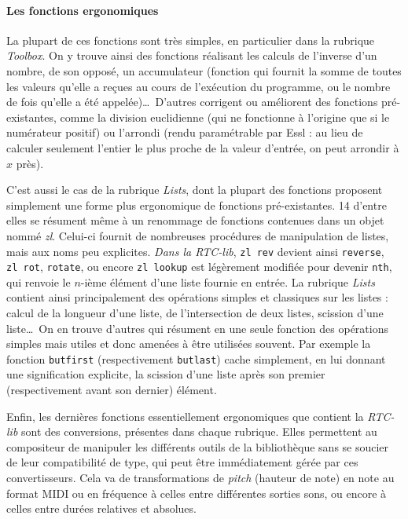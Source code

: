 \documentclass[a4paper,12pt]{article}
\begin{document}
\paragraph{Les fonctions ergonomiques \\}

La plupart de ces fonctions sont très simples, en particulier dans la rubrique \emph{Toolbox}. On y trouve ainsi des fonctions réalisant les calculs de l'inverse d'un nombre, de son opposé, un accumulateur (fonction qui fournit la somme de toutes les valeurs qu'elle a reçues au cours de l'exécution du programme, ou le nombre de fois qu'elle a été appelée)\dots~D'autres corrigent ou améliorent des fonctions pré-existantes, comme la division euclidienne (qui ne fonctionne à l'origine que si le numérateur positif) ou l'arrondi (rendu paramétrable par Essl : au lieu de calculer seulement l'entier le plus proche de la valeur d'entrée, on peut arrondir à $x$ près).

C'est aussi le cas de la rubrique \emph{Lists}, dont la plupart des fonctions proposent simplement une forme plus ergonomique de fonctions pré-existantes. 14 d'entre elles se résument même à un renommage de fonctions contenues dans un objet nommé \emph{zl}. Celui-ci fournit de nombreuses procédures de manipulation de listes, mais aux noms peu explicites. \emph{Dans la RTC-lib}, \texttt{zl~rev} devient ainsi \texttt{reverse}, \texttt{zl~rot}, \texttt{rotate}, ou encore \texttt{zl~lookup} est légèrement modifiée pour devenir \texttt{nth}, qui renvoie le $n$-ième élément d'une liste fournie en entrée. La rubrique \emph{Lists} contient ainsi principalement des opérations simples et classiques sur les listes : calcul de la longueur d'une liste, de l'intersection de deux listes, scission d'une liste\dots~On en trouve d'autres qui résument en une seule fonction des opérations simples mais utiles et donc amenées à être utilisées souvent. Par exemple la fonction \texttt{butfirst} (respectivement \texttt{butlast}) cache simplement, en lui donnant une signification explicite, la scission d'une liste après son premier (respectivement avant son dernier) élément.

Enfin, les dernières fonctions essentiellement ergonomiques que contient la \emph{RTC-lib} sont des conversions, présentes dans chaque rubrique. Elles permettent au compositeur de manipuler les différents outils de la bibliothèque sans se soucier de leur compatibilité de type, qui peut être immédiatement gérée par ces convertisseurs. Cela va de transformations de \emph{pitch} (hauteur de note) en note au format MIDI ou en fréquence à celles entre différentes sorties sons, ou encore à celles entre durées relatives et absolues.
\end{document}
